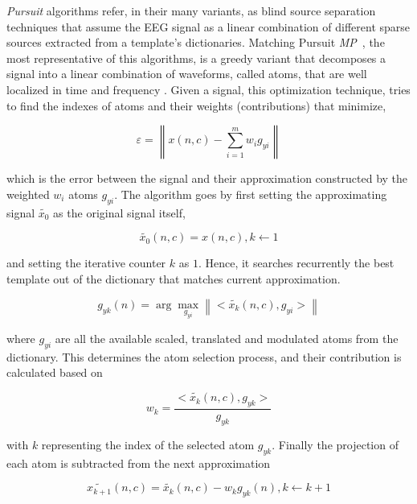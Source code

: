 \documentclass[brainsci,article,submit,moreauthors,pdftex,10pt,a4paper]{mdpi}
\begin{document}
\textit{Pursuit} algorithms refer, in their many variants, as blind source separation \citep{Vincent2010} techniques that assume the EEG signal as a linear combination of different sparse sources extracted from a template's dictionaries.  Matching Pursuit \textit{MP}~\citep{Mallat1993}, the most representative of this algorithms, is a greedy variant that decomposes a signal into a linear combination of waveforms, called atoms, that are well localized in time and frequency \citep{ChandranKS2016}.  Given a signal, this optimization technique, tries to find the indexes of atoms and their weights (contributions) that minimize,


\begin{equation}
\varepsilon =  \left\lVert   x(n,c) - \sum_{i=1}^{m} w_i g_{yi}   \right\rVert
\label{eq:mperror}
\end{equation}

which is the error between the signal and their approximation constructed by the weighted $w_i$ atoms $g_{yi}$.  The algorithm goes by first setting the approximating signal $\tilde{x_{0}}$  as the original signal itself,  

\begin{equation}
\tilde{x_{0}}(n,c) = x(n,c), k \leftarrow 1
\label{eq:multiclassificationrow}
\end{equation}

\noindent and setting the iterative counter $k$ as $1$. Hence, it searches recurrently the best template out of the dictionary  that matches current approximation.  

\begin{equation}
g_{yk}(n) = \arg \max_{g_{yi}} \left\lVert < \tilde{x_{k}}(n,c), g_{yi} > \right\rVert 
\label{eq:multiclassificationrow}
\end{equation}

where $g_{yi}$ are all the available scaled, translated and modulated atoms from the dictionary.  This determines the atom selection process, and their contribution is calculated based on 

\begin{equation}
w_{k} =  \frac{< \tilde{x_{k}}(n,c), g_{yk} >}{g_{yk}}
\label{eq:multiclassificationrow}
\end{equation}

with $k$ representing the index of the selected atom $g_{yk}$.  Finally the projection of each atom is subtracted from the next approximation~\citep{Cohen2014,Sanei2007, Mallat1993}

\begin{equation}
\tilde{x_{k+1}}(n,c)=  \tilde{x_k}(n,c) - w_{k} g_{yk} (n), k \leftarrow k + 1
\label{eq:multiclassificationrow}
\end{equation}
\end{document}
